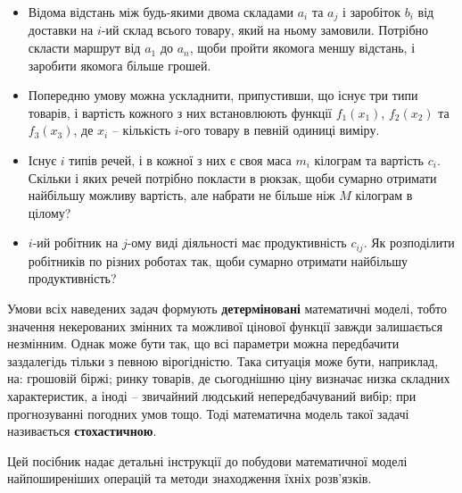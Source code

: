 \documentclass[../book.tex]{subfiles}
\begin{document}
\begin{itemize}
 \item Відома відстань між будь-якими двома складами $a_i$ та $a_j$ і заробіток $b_i$ від доставки на $i$-ий склад всього товару, який на ньому замовили. Потрібно скласти маршрут від $a_1$ до $a_n$, щоби пройти якомога меншу відстань, і заробити якомога більше грошей.
 \item Попередню умову можна ускладнити, припустивши, що існує три типи товарів, і вартість кожного з них встановлюють функції $f_1(x_1)$, $f_2(x_2)$ та $f_3(x_3)$, де $x_i$ -- кількість $i$-ого товару в певній одиниці виміру.
 \item Існує $i$ типів речей, і в кожної з них є своя маса $m_i$ кілограм та вартість $c_i$. Скільки і яких речей потрібно покласти в рюкзак, щоби сумарно отримати найбільшу можливу вартість, але набрати не більше ніж $M$ кілограм в цілому?
 \item $i$-ий робітник на $j$-ому виді діяльності має продуктивність $c_{ij}$. Як розподілити робітників по різних роботах так, щоби сумарно отримати найбільшу продуктивність?
\end{itemize}

Умови всіх наведених задач формують \textbf{детерміновані} математичні моделі, тобто значення некерованих змінних та можливої цінової функції завжди залишається незмінним. Однак може бути так, що всі параметри можна передбачити заздалегідь тільки з певною вірогідністю. Така ситуація може бути, наприклад, на: грошовій біржі; ринку товарів, де сьогоднішню ціну визначає низка складних характеристик, а іноді -- звичайний людський непередбачуваний вибір; при прогнозуванні погодних умов тощо. Тоді математична модель такої задачі називається \textbf{стохастичною}.

Цей посібник надає детальні інструкції до побудови математичної моделі найпоширеніших операцій та методи знаходження їхніх розв'язків.
\end{document}
